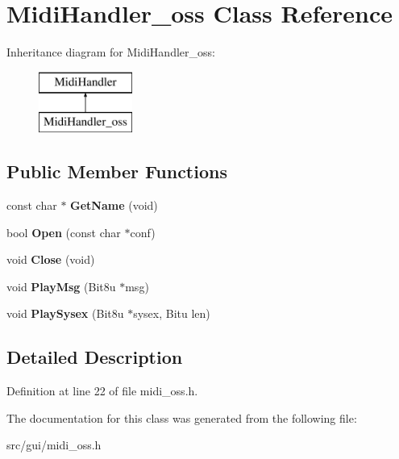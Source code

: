 \hypertarget{classMidiHandler__oss}{\section{Midi\-Handler\-\_\-oss Class Reference}
\label{classMidiHandler__oss}
}
Inheritance diagram for Midi\-Handler\-\_\-oss\-:\begin{figure}[H]
\begin{center}
\leavevmode
\includegraphics[height=2.000000cm]{classMidiHandler__oss}
\end{center}
\end{figure}
\subsection*{Public Member Functions}
\begin{DoxyCompactItemize}
\item 
\hypertarget{classMidiHandler__oss_ad1e1ee55c47486466ae13493100898b7}{const char $\ast$ {\bfseries Get\-Name} (void)}\label{classMidiHandler__oss_ad1e1ee55c47486466ae13493100898b7}

\item 
\hypertarget{classMidiHandler__oss_aa0af8d2c1bead6d276e2bbede0572179}{bool {\bfseries Open} (const char $\ast$conf)}\label{classMidiHandler__oss_aa0af8d2c1bead6d276e2bbede0572179}

\item 
\hypertarget{classMidiHandler__oss_ae49cbe405654c8b7daede4f9fd930e1b}{void {\bfseries Close} (void)}\label{classMidiHandler__oss_ae49cbe405654c8b7daede4f9fd930e1b}

\item 
\hypertarget{classMidiHandler__oss_a9be30e848f737d7f80a19b77d9101c14}{void {\bfseries Play\-Msg} (Bit8u $\ast$msg)}\label{classMidiHandler__oss_a9be30e848f737d7f80a19b77d9101c14}

\item 
\hypertarget{classMidiHandler__oss_a45bf1b2770d24800c34fe4f92f9e4010}{void {\bfseries Play\-Sysex} (Bit8u $\ast$sysex, Bitu len)}\label{classMidiHandler__oss_a45bf1b2770d24800c34fe4f92f9e4010}

\end{DoxyCompactItemize}


\subsection{Detailed Description}


Definition at line 22 of file midi\-\_\-oss.\-h.



The documentation for this class was generated from the following file\-:\begin{DoxyCompactItemize}
\item 
src/gui/midi\-\_\-oss.\-h\end{DoxyCompactItemize}

